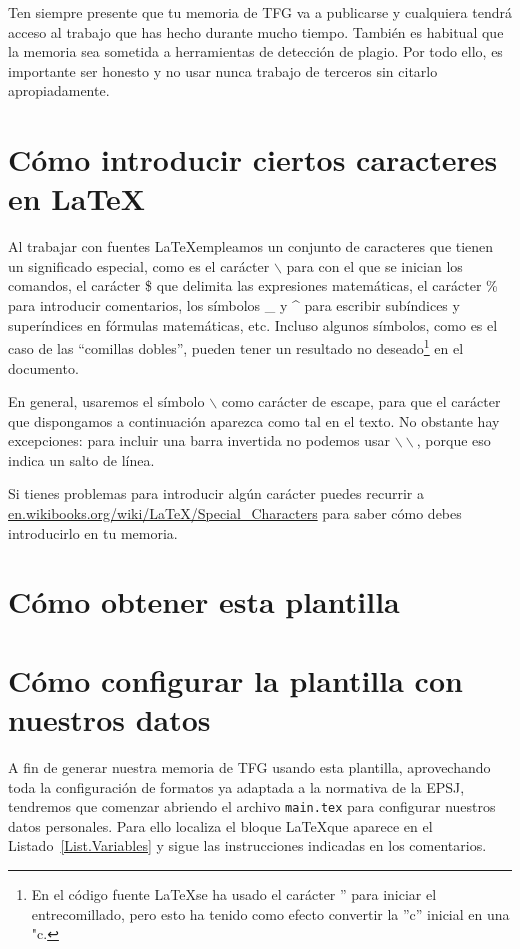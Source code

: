 Ten siempre presente que tu memoria de TFG va a publicarse y cualquiera tendrá acceso al trabajo que has hecho durante mucho tiempo. También es habitual que la memoria sea sometida a herramientas de detección de plagio. Por todo ello, es importante ser honesto y no usar nunca trabajo de terceros sin citarlo apropiadamente.

\section{Cómo introducir ciertos caracteres en \LaTeX}

Al trabajar con fuentes \LaTeX empleamos un conjunto de caracteres que tienen un significado especial, como es el carácter $\backslash$ para con el que se inician los comandos, el carácter \$ que delimita las expresiones matemáticas, el carácter \% para introducir comentarios, los símbolos \_ y \^{} para escribir subíndices y superíndices en fórmulas matemáticas, etc.
Incluso algunos símbolos, como es el caso de las ``comillas dobles'', pueden tener un resultado no deseado\footnote{En el código fuente \LaTeX se ha usado el carácter '' para iniciar el entrecomillado, pero esto ha tenido como efecto convertir la ''c'' inicial en una "c.} en el documento.

En general, usaremos el símbolo $\backslash$ como carácter de escape, para que el carácter que dispongamos a continuación aparezca como tal en el texto. No obstante hay excepciones: para incluir una barra invertida no podemos usar $\backslash\backslash$, porque eso indica un salto de línea.

Si tienes problemas para introducir algún carácter puedes recurrir a \url{en.wikibooks.org/wiki/LaTeX/Special_Characters} para saber cómo debes introducirlo en tu memoria.

\section{Cómo obtener esta plantilla}

\section{Cómo configurar la plantilla con nuestros datos}

A fin de generar nuestra memoria de TFG usando esta plantilla, aprovechando toda la configuración de formatos ya adaptada a la normativa de la EPSJ, tendremos que comenzar abriendo el archivo \texttt{main.tex} para configurar nuestros datos personales. Para ello localiza el bloque \LaTeX que aparece en el Listado~\ref{List.Variables} y sigue las instrucciones indicadas en los comentarios.

